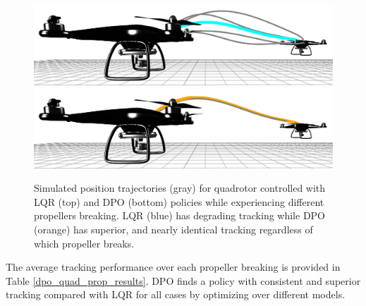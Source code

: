 \begin{figure}[H]
	\centering
	\includegraphics[width=.45\textwidth]{dpo/quadrotor_to_grid.png}
	\vspace{0.01\textwidth}
	\includegraphics[width=.45\textwidth]{dpo/quadrotor_dpo_grid.png}
	\caption[Tracking comparison for LQR and Direct Policy Optimization for quadrotor]{Simulated position trajectories (gray) for quadrotor controlled with LQR (top) and DPO (bottom) policies while experiencing different propellers breaking. LQR (blue) has degrading tracking while DPO (orange) has superior, and nearly identical tracking regardless of which propeller breaks.}
	\label{dpo_quadrotor_prop}
\end{figure}

The average tracking performance over each propeller breaking is provided in Table \ref{dpo_quad_prop_results}. DPO finds a policy with consistent and superior tracking compared with LQR for all cases by optimizing over different models.

